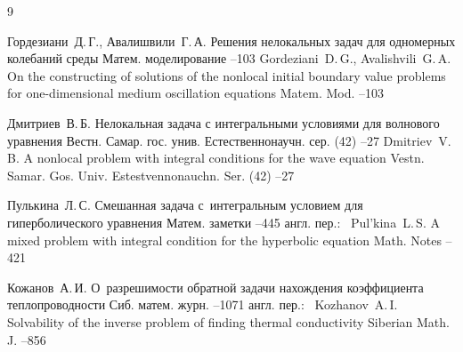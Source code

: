 \begin{thebibliography}{9}

\by Гордезиани~Д.\,Г., Авалишвили~Г.\,А.
\paper Решения нелокальных задач для одномерных колебаний среды
\jour Матем. моделирование
--103
\misctransl
\by Gordeziani~D.\,G., Avalishvili~G.\,A.
\paper On the constructing of solutions of the nonlocal initial boundary value problems for one-dimensional medium oscillation equations
\jour Matem. Mod.
--103



\by Дмитриев~В.\,Б.
\paper Нелокальная задача с интегральными условиями для волнового уравнения
\jour Вестн. Самар. гос. унив. Естественнонаучн. сер.
(42)
--27
\misctransl
\by Dmitriev~V.\,B. 
\paper A nonlocal problem with integral conditions for the wave equation
\jour Vestn. Samar. Gos. Univ. Estestvennonauchn. Ser. 
(42)
--27

\by Пулькина~Л.\,С.
\paper Смешанная задача с~интегральным условием для гиперболического уравнения
\jour Матем. заметки
--445
\transl англ. пер.:~
\by Pul'kina~L.\,S.
\paper A mixed problem with integral condition for the hyperbolic equation
\jour Math. Notes
--421


\by Кожанов~А.\,И.
\paper О~разрешимости обратной задачи нахождения коэффициента теплопроводности
\jour Сиб. матем. журн.
--1071
\transl англ. пер.:~
\by Kozhanov~A.\,I.
\paper Solvability of the inverse problem of finding thermal conductivity
\jour Siberian Math. J.
--856



\end{thebibliography}
